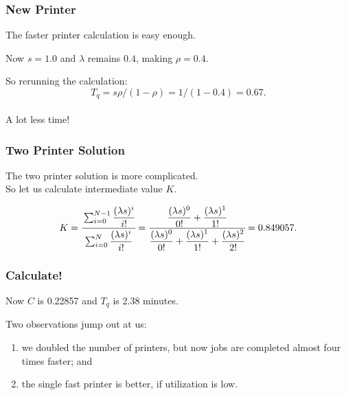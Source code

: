 \begin{frame}
\frametitle{New Printer}

\large
\begin{changemargin}{1.5cm}
The faster printer calculation is easy enough. 

Now $s = 1.0$ and $\lambda$ remains $0.4$, making $\rho = 0.4$. 

So rerunning the calculation: 
\[ T_{q} = s\rho / (1 - \rho ) = 1 / (1 - 0.4 ) = 0.67.\]
~\\[0em]

A lot less time!
\end{changemargin}

\end{frame}



\begin{frame}
\frametitle{Two Printer Solution}

\large
\begin{changemargin}{1.5cm}
The two printer solution is more complicated. \\
So let us calculate intermediate value $K$.

	\[ K = \cfrac{\sum_{i=0}^{N-1}\dfrac{(\lambda s)^{i}}{i!}}{{\sum_{i=0}^{N}\dfrac{(\lambda s)^{i}}{i!}}} = \cfrac{\dfrac{(\lambda s)^{0}}{0!} + \dfrac{(\lambda s)^{1}}{1!}}{\dfrac{(\lambda s)^{0}}{0!} + \dfrac{(\lambda s)^{1}}{1!} + \dfrac{(\lambda s)^{2}}{2!}} = 0.849057.
\]
	
\end{changemargin}
\end{frame}



\begin{frame}
\frametitle{Calculate!}

\large
\begin{changemargin}{1.5cm}
Now $C$ is 0.22857 and $T_{q}$ is 2.38 minutes. 

Two observations jump out at us: \\[0em]
\begin{enumerate}
\item we doubled the number of printers, but now jobs are completed almost four times faster; and 
\item the single fast printer is better, if utilization is low.
\end{enumerate}
\end{changemargin}
\end{frame}



